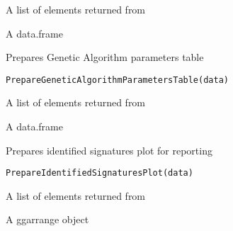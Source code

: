 \documentclass[letterpaper]{book}
\begin{document}
%
\begin{Arguments}
\begin{ldescription}
\item[\code{data}] A list of elements returned from 
\end{ldescription}
\end{Arguments}
%
\begin{Value}
A data.frame
\end{Value}
%
\begin{Description}\relax
Prepares Genetic Algorithm parameters table
\end{Description}
%
\begin{Usage}
\begin{verbatim}
PrepareGeneticAlgorithmParametersTable(data)
\end{verbatim}
\end{Usage}
%
\begin{Arguments}
\begin{ldescription}
\item[\code{data}] A list of elements returned from 
\end{ldescription}
\end{Arguments}
%
\begin{Value}
A data.frame
\end{Value}
%
\begin{Description}\relax
Prepares identified signatures plot for reporting
\end{Description}
%
\begin{Usage}
\begin{verbatim}
PrepareIdentifiedSignaturesPlot(data)
\end{verbatim}
\end{Usage}
%
\begin{Arguments}
\begin{ldescription}
\item[\code{data}] A list of elements returned from 
\end{ldescription}
\end{Arguments}
%
\begin{Value}
A ggarrange object
\end{Value}
\end{document}
